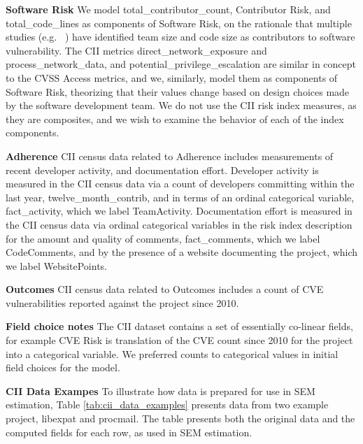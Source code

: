 \textbf{Software Risk}
We model total\_contributor\_count, Contributor Risk, and total\_code\_lines as components of Software Risk, on the rationale that multiple studies (e.g. ~\cite{camilo2015do,dashevskyi2016on}) have identified team size and code size as contributors to software vulnerability. The CII metrics direct\_network\_exposure and process\_network\_data, and potential\_privilege\_escalation are similar in concept to the CVSS Access metrics, and we, similarly, model them as components of Software Risk, theorizing that their values change based on design choices made by the software development team. We do not use the CII risk index measures, as they are composites, and we wish to examine the behavior of each of the index components.

\textbf{Adherence}
CII census data related to Adherence includes measurements of recent developer activity, and documentation effort. Developer activity is measured in the CII census data via a count of developers committing within the last year, twelve\_month\_contrib, and in terms of an ordinal categorical variable, fact\_activity, which we label TeamActivity. Documentation effort is measured in the CII census data via ordinal categorical variables in the risk index description for the amount and quality of comments, fact\_comments, which we label CodeComments, and by the presence of a website documenting the project, which we label WebsitePoints.

\textbf{Outcomes}
CII census data related to Outcomes includes a count of CVE vulnerabilities reported against the project since 2010. 

\textbf{Field choice notes}
The CII dataset contains a set of essentially co-linear fields, for example CVE Risk is translation of the CVE count since 2010 for the project into a categorical variable. We preferred counts to categorical values in initial field choices for the model.

\textbf{CII Data Exampes}
To illustrate how data is prepared for use in SEM estimation, Table \ref{tab:cii_data_examples} presents data from two example project, libexpat and procmail.  The table presents both the original data and the computed fields for each row, as used in SEM estimation.

